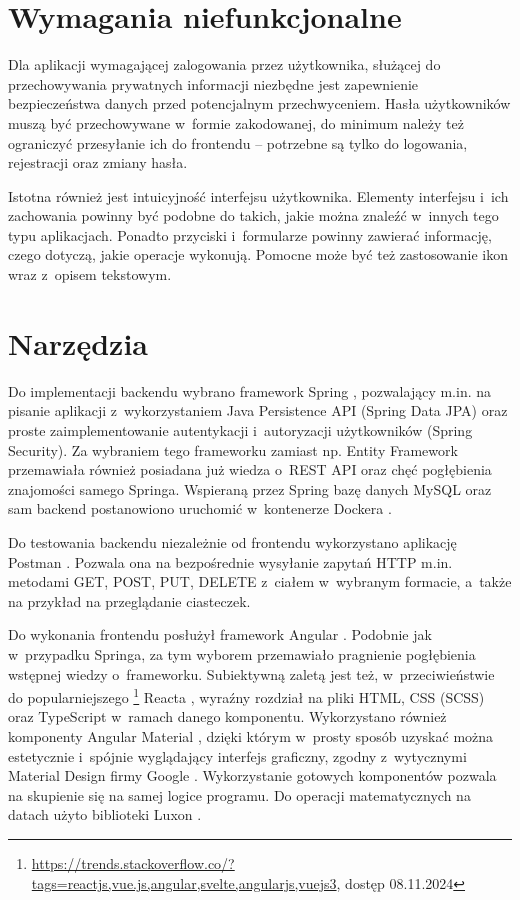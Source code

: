 \documentclass[a4paper,twoside,12pt]{book}
\begin{document}
\section{Wymagania niefunkcjonalne}

Dla aplikacji wymagającej zalogowania przez użytkownika, służącej do przechowywania prywatnych informacji niezbędne jest zapewnienie bezpieczeństwa danych przed potencjalnym przechwyceniem. Hasła użytkowników muszą być przechowywane w~formie zakodowanej, do minimum należy też ograniczyć przesyłanie ich do frontendu -- potrzebne są tylko do logowania, rejestracji oraz zmiany hasła.

Istotna również jest intuicyjność interfejsu użytkownika. Elementy interfejsu i~ich zachowania powinny być podobne do takich, jakie można znaleźć w~innych tego typu aplikacjach. Ponadto przyciski i~formularze powinny zawierać informację, czego dotyczą, jakie operacje wykonują. Pomocne może być też zastosowanie ikon wraz z~opisem tekstowym.

\section{Narzędzia}

Do implementacji backendu wybrano framework Spring \cite{bib:spring}, pozwalający m.in. na pisanie aplikacji z~wykorzystaniem Java Persistence API (Spring Data JPA) oraz proste zaimplementowanie autentykacji i~autoryzacji użytkowników (Spring Security). Za wybraniem tego frameworku zamiast np. Entity Framework \cite{bib:entityframework} przemawiała również posiadana już wiedza o~REST API oraz chęć pogłębienia znajomości samego Springa.
Wspieraną przez Spring bazę danych MySQL \cite{bib:mysql} oraz sam backend postanowiono uruchomić w~kontenerze Dockera \cite{bib:docker}.

Do testowania backendu niezależnie od frontendu wykorzystano aplikację Postman \cite{bib:postman}. Pozwala ona na bezpośrednie wysyłanie zapytań HTTP m.in. metodami GET, POST, PUT, DELETE z~ciałem w~wybranym formacie, a~także na przykład na przeglądanie ciasteczek.

Do wykonania frontendu posłużył framework Angular \cite{bib:angularnew,bib:angularold}. Podobnie jak w~przypadku Springa, za tym wyborem przemawiało pragnienie pogłębienia wstępnej wiedzy o~frameworku. Subiektywną zaletą jest też, w~przeciwieństwie do popularniejszego \footnote{\url{https://trends.stackoverflow.co/?tags=reactjs,vue.js,angular,svelte,angularjs,vuejs3}, dostęp 08.11.2024} Reacta \cite{bib:react}, wyraźny rozdział na pliki HTML, CSS (SCSS) oraz TypeScript w~ramach danego komponentu. 
Wykorzystano również komponenty Angular Material \cite{bib:angularmaterial}, dzięki którym w~prosty sposób uzyskać można estetycznie i~spójnie wyglądający interfejs graficzny, zgodny z~wytycznymi Material Design firmy Google \cite{bib:material}. Wykorzystanie gotowych komponentów pozwala na skupienie się na samej logice programu. Do operacji matematycznych na datach użyto biblioteki Luxon \cite{bib:luxon}.
\end{document}
